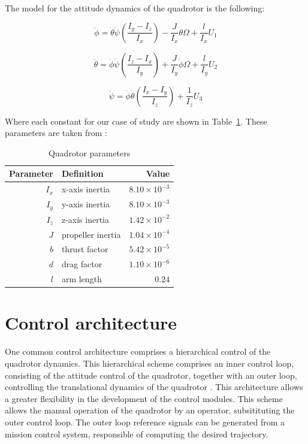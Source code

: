 \documentclass[12pt]{article}
\begin{document}
The model for the attitude dynamics of the quadrotor is the following:

\begin{equation}
\label{eq:dyn-roll}
\ddot{\phi} = \dot{\theta} \dot{\psi} \left ( \frac{I_y-I_z}{I_x} \right ) - \frac{J}{I_x} \dot{\theta} \Omega + \frac{l}{I_x} U_1
\end{equation}

\begin{equation}
\label{eq:dyn-pitch}
\ddot{\theta} = \dot{\phi} \dot{\psi} \left ( \frac{I_z-I_x}{I_y} \right ) + \frac{J}{I_y} \dot{\phi} \Omega + \frac{l}{I_y} U_2
\end{equation}

\begin{equation}
\label{eq:dyn-yaw}
\ddot{\psi} = \dot{\phi} \dot{\theta} \left ( \frac{I_x-I_y}{I_z} \right ) + \frac{1}{I_z} U_3
\end{equation}

Where each constant for our case of study are shown in Table~\ref{tab:parameters}. These parameters are taken from \cite{Merh14} :

\begin{table}
  \begin{center}
    \caption{Quadrotor parameters}\label{tab:parameters}
    \begin{tabular}{rlr}
      \hline
      Parameter & Definition & Value \\
      \hline                  
      $I_x$ & x-axis inertia & $8.10 \times {10}^{-3}$\\
      $I_y$ & y-axis inertia & $8.10 \times {10}^{-3}$\\
      $I_z$ & z-axis inertia & $1.42 \times {10}^{-2}$ \\
      $J$ & propeller inertia & $1.04 \times {10}^{-4}$ \\
      $b$ & thrust factor & $ 5.42 \times {10}^{-5}$ \\
      $d$ & drag factor & $ 1.10 \times{10}^{-6}$ \\
      $l$ & arm length & $0.24$ \\
      \hline
    \end{tabular}
  \end{center}
\end{table}

\section{Control architecture}
One common control architecture comprises a hierarchical control of the quadrotor dynamics. This hierarchical scheme comprises an inner control loop, consisting of the attitude control of the quadrotor, together with an outer loop, controlling the translational dynamics of the quadrotor \cite{Raff10}. This architecture allows a greater flexibility in the development of the control modules. This scheme allows the manual operation of the quadrotor by an operator, subsitituting the outer control loop. The outer loop reference signals can be generated from a mission control system, responsible of computing the desired trajectory.
\end{document}
